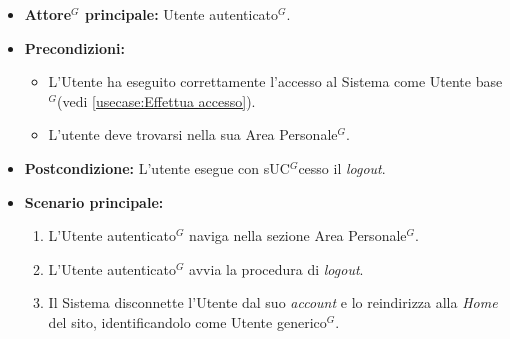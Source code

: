 \label{usecase:Effettua Logout}
\begin{itemize}
	\item \textbf{\gls{Attore}$^G$ principale:} \gls{Utente autenticato}$^G$.

	\item \textbf{Precondizioni:}
	\begin{itemize}
        \item L'Utente ha eseguito correttamente l'accesso al Sistema come \gls{Utente base}$^G$(vedi \autoref{usecase:Effettua accesso}).
        \item L'utente deve trovarsi nella sua Area Personale$^G$.
    \end{itemize}

	\item \textbf{Postcondizione:} L'utente esegue con s\gls{UC}$^G$cesso il \textit{logout}.

	\item \textbf{Scenario principale:}
	      \begin{enumerate}
		      \item L'\gls{Utente autenticato}$^G$ naviga nella sezione Area Personale$^G$.
		      \item L'\gls{Utente autenticato}$^G$ avvia la procedura di \textit{logout}.
              \item Il Sistema disconnette l'Utente dal suo \textit{account} e lo reindirizza alla \textit{Home} del sito, identificandolo come \gls{Utente generico}$^G$.
	      \end{enumerate}
\end{itemize}
